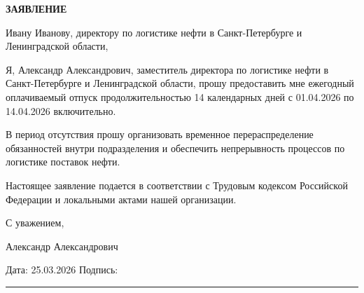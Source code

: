 \documentclass[12pt]{article}
\begin{document}
\begin{center}
\textbf{\LARGE ЗАЯВЛЕНИЕ}
\end{center}

\vspace{1cm}



Ивану Иванову, директору по логистике нефти в Санкт-Петербурге и Ленинградской области,

Я, Александр Александрович, заместитель директора по логистике нефти в Санкт-Петербурге и Ленинградской области, прошу предоставить мне ежегодный оплачиваемый отпуск продолжительностью 14 календарных дней с 01.04.2026 по 14.04.2026 включительно.

В период отсутствия прошу организовать временное перераспределение обязанностей внутри подразделения и обеспечить непрерывность процессов по логистике поставок нефти.

Настоящее заявление подается в соответствии с Трудовым кодексом Российской Федерации и локальными актами нашей организации.

С уважением,

Александр Александрович


\vfill

\noindent
Дата: 25.03.2026 \hfill Подпись: \rule{5cm}{0.4pt}
\end{document}
